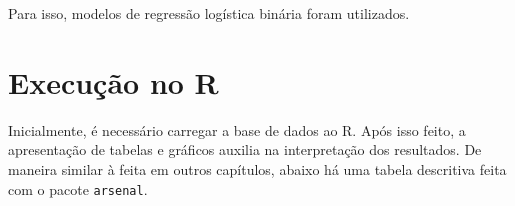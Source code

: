 \documentclass[
]{book}
\newenvironment{Shaded}{\begin{snugshade}}{\end{snugshade}}
\newcommand{\DataTypeTok}[1]{\textcolor[rgb]{0.13,0.29,0.53}{#1}}
\newcommand{\KeywordTok}[1]{\textcolor[rgb]{0.13,0.29,0.53}{\textbf{#1}}}
\newcommand{\NormalTok}[1]{#1}
\newcommand{\OperatorTok}[1]{\textcolor[rgb]{0.81,0.36,0.00}{\textbf{#1}}}
\newcommand{\OtherTok}[1]{\textcolor[rgb]{0.56,0.35,0.01}{#1}}
\newcommand{\StringTok}[1]{\textcolor[rgb]{0.31,0.60,0.02}{#1}}
\begin{document}
Para isso, modelos de regressão logística binária foram utilizados.

\hypertarget{execuuxe7uxe3o-no-r-15}{%
\section{Execução no R}\label{execuuxe7uxe3o-no-r-15}}

Inicialmente, é necessário carregar a base de dados ao R. Após isso
feito, a apresentação de tabelas e gráficos auxilia na interpretação dos
resultados. De maneira similar à feita em outros capítulos, abaixo há
uma tabela descritiva feita com o pacote \texttt{arsenal}.

\begin{Shaded}
\end{Shaded}
\end{document}
